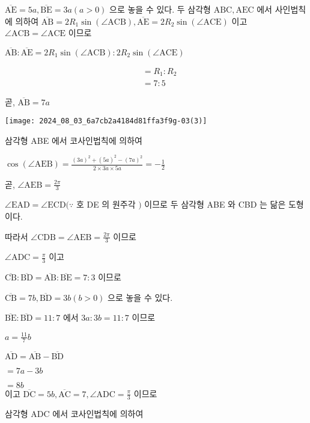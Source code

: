 \documentclass[10pt]{article}
\begin{document}
\(\overline{\mathrm{AE}}=5 a, \overline{\mathrm{BE}}=3 a(a>0)\) 으로 놓을 수 있다. 두 삼각형 \(\mathrm{ABC}, \mathrm{AEC}\) 에서 사인법칙에 의하여 \(\overline{\mathrm{AB}}=2 R_{1} \sin (\angle \mathrm{ACB}), \overline{\mathrm{AE}}=2 R_{2} \sin (\angle \mathrm{ACE})\) 이고 \(\angle \mathrm{ACB}=\angle \mathrm{ACE}\) 이므로

\(\overline{\mathrm{AB}}: \overline{\mathrm{AE}}=2 R_{1} \sin (\angle \mathrm{ACB}): 2 R_{2} \sin (\angle \mathrm{ACE})\)

\[
\begin{aligned}
& =R_{1}: R_{2} \\
& =7: 5
\end{aligned}
\]

곧, \(\overline{\mathrm{AB}}=7 a\)

\begin{center}
\texttt{[image: 2024\_08\_03\_6a7cb2a4184d81ffa3f9g-03(3)]}
\end{center}

삼각형 ABE 에서 코사인법칙에 의하여

\(\cos (\angle \mathrm{AEB})=\frac{(3 a)^{2}+(5 a)^{2}-(7 a)^{2}}{2 \times 3 a \times 5 a}=-\frac{1}{2}\)

곧, \(\angle \mathrm{AEB}=\frac{2 \pi}{3}\)

\(\angle \mathrm{EAD}=\angle \mathrm{ECD}(\because\) 호 DE 의 원주각 \()\) 이므로 두 삼각형 ABE 와 CBD 는 닮은 도형이다.

따라서 \(\angle \mathrm{CDB}=\angle \mathrm{AEB}=\frac{2 \pi}{3}\) 이므로

\(\angle \mathrm{ADC}=\frac{\pi}{3}\) 이고

\(\overline{\mathrm{CB}}: \overline{\mathrm{BD}}=\overline{\mathrm{AB}}: \overline{\mathrm{BE}}=7: 3\) 이므로

\(\overline{\mathrm{CB}}=7 b, \overline{\mathrm{BD}}=3 b(b>0)\) 으로 놓을 수 있다.

\(\overline{\mathrm{BE}}: \overline{\mathrm{BD}}=11: 7\) 에서 \(3 a: 3 b=11: 7\) 이므로

\(a=\frac{11}{7} b\)

\(\overline{\mathrm{AD}}=\overline{\mathrm{AB}}-\overline{\mathrm{BD}}\)

\(=7 a-3 b\)

\(=8 b\)\\
이고 \(\overline{\mathrm{DC}}=5 b, \overline{\mathrm{AC}}=7, \angle \mathrm{ADC}=\frac{\pi}{3}\) 이므로

삼각형 ADC 에서 코사인법칙에 의하여
\end{document}

